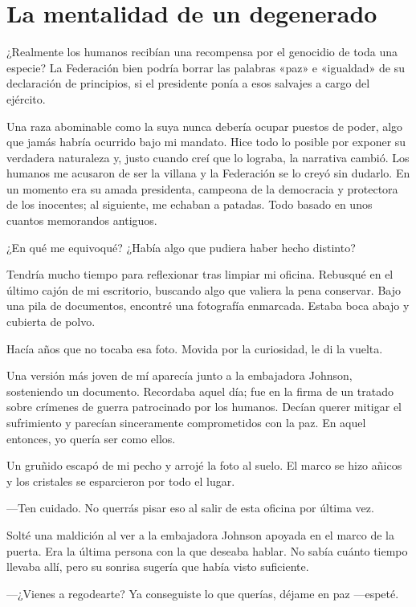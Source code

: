\chapter{La mentalidad de un degenerado}\label{sec:la-mentalidad-de-un-degenerado}

¿Realmente los humanos recibían una recompensa por el genocidio de toda una especie? La Federación bien podría borrar las palabras «paz» e «igualdad» de su declaración de principios, si el presidente ponía a esos salvajes a cargo del ejército.

Una raza abominable como la suya nunca debería ocupar puestos de poder, algo que jamás habría ocurrido bajo mi mandato. Hice todo lo posible por exponer su verdadera naturaleza y, justo cuando creí que lo lograba, la narrativa cambió. Los humanos me acusaron de ser la villana y la Federación se lo creyó sin dudarlo. En un momento era su amada presidenta, campeona de la democracia y protectora de los inocentes; al siguiente, me echaban a patadas. Todo basado en unos cuantos memorandos antiguos.

¿En qué me equivoqué? ¿Había algo que pudiera haber hecho distinto?

Tendría mucho tiempo para reflexionar tras limpiar mi oficina. Rebusqué en el último cajón de mi escritorio, buscando algo que valiera la pena conservar. Bajo una pila de documentos, encontré una fotografía enmarcada. Estaba boca abajo y cubierta de polvo.

Hacía años que no tocaba esa foto. Movida por la curiosidad, le di la vuelta.

Una versión más joven de mí aparecía junto a la embajadora Johnson, sosteniendo un documento. Recordaba aquel día; fue en la firma de un tratado sobre crímenes de guerra patrocinado por los humanos. Decían querer mitigar el sufrimiento y parecían sinceramente comprometidos con la paz. En aquel entonces, yo quería ser como ellos.

Un gruñido escapó de mi pecho y arrojé la foto al suelo. El marco se hizo añicos y los cristales se esparcieron por todo el lugar.

—Ten cuidado. No querrás pisar eso al salir de esta oficina por última vez.

Solté una maldición al ver a la embajadora Johnson apoyada en el marco de la puerta. Era la última persona con la que deseaba hablar. No sabía cuánto tiempo llevaba allí, pero su sonrisa sugería que había visto suficiente.

 —¿Vienes a regodearte? Ya conseguiste lo que querías, déjame en paz —espeté.

